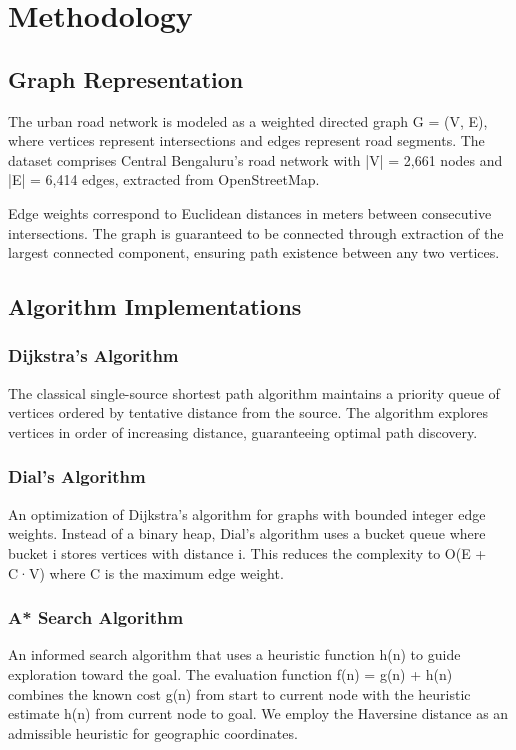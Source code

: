 \documentclass[conference]{IEEEtran}
\begin{document}
\section{Methodology}

\subsection{Graph Representation}

The urban road network is modeled as a weighted directed graph G = (V, E), where vertices represent intersections and edges represent road segments. The dataset comprises Central Bengaluru's road network with |V| = 2,661 nodes and |E| = 6,414 edges, extracted from OpenStreetMap.

Edge weights correspond to Euclidean distances in meters between consecutive intersections. The graph is guaranteed to be connected through extraction of the largest connected component, ensuring path existence between any two vertices.

\subsection{Algorithm Implementations}

\subsubsection{Dijkstra's Algorithm}
The classical single-source shortest path algorithm maintains a priority queue of vertices ordered by tentative distance from the source. The algorithm explores vertices in order of increasing distance, guaranteeing optimal path discovery.

\subsubsection{Dial's Algorithm}
An optimization of Dijkstra's algorithm for graphs with bounded integer edge weights. Instead of a binary heap, Dial's algorithm uses a bucket queue where bucket i stores vertices with distance i. This reduces the complexity to O(E + C·V) where C is the maximum edge weight.

\subsubsection{A* Search Algorithm}
An informed search algorithm that uses a heuristic function h(n) to guide exploration toward the goal. The evaluation function f(n) = g(n) + h(n) combines the known cost g(n) from start to current node with the heuristic estimate h(n) from current node to goal. We employ the Haversine distance as an admissible heuristic for geographic coordinates.
\end{document}
